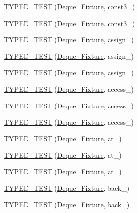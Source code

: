 \begin{DoxyCompactItemize}
\hyperlink{TestDeque_8c_09_09_ab358ac4c3269d7267b98cc0cddc690f0}{T\-Y\-P\-E\-D\-\_\-\-T\-E\-S\-T} (\hyperlink{structDeque__Fixture}{Deque\-\_\-\-Fixture}, const3\-\_)
\item 
\hyperlink{TestDeque_8c_09_09_abcf49f52a3b989cfde5d159c2fe7f635}{T\-Y\-P\-E\-D\-\_\-\-T\-E\-S\-T} (\hyperlink{structDeque__Fixture}{Deque\-\_\-\-Fixture}, const3\-\_)
\item 
\hyperlink{TestDeque_8c_09_09_a9a792cdc798d415d2d57588b804fd1e3}{T\-Y\-P\-E\-D\-\_\-\-T\-E\-S\-T} (\hyperlink{structDeque__Fixture}{Deque\-\_\-\-Fixture}, assign\-\_)
\item 
\hyperlink{TestDeque_8c_09_09_a16fcf777109c9ce6a9fad39225b5e56f}{T\-Y\-P\-E\-D\-\_\-\-T\-E\-S\-T} (\hyperlink{structDeque__Fixture}{Deque\-\_\-\-Fixture}, assign\-\_)
\item 
\hyperlink{TestDeque_8c_09_09_a0ce7f9e9f11841acd432236d64a496e5}{T\-Y\-P\-E\-D\-\_\-\-T\-E\-S\-T} (\hyperlink{structDeque__Fixture}{Deque\-\_\-\-Fixture}, assign\-\_)
\item 
\hyperlink{TestDeque_8c_09_09_a20dd092cb6619e4101dab0f8c3861472}{T\-Y\-P\-E\-D\-\_\-\-T\-E\-S\-T} (\hyperlink{structDeque__Fixture}{Deque\-\_\-\-Fixture}, access\-\_)
\item 
\hyperlink{TestDeque_8c_09_09_abc7b13e109a90839d7f24f935b0564c9}{T\-Y\-P\-E\-D\-\_\-\-T\-E\-S\-T} (\hyperlink{structDeque__Fixture}{Deque\-\_\-\-Fixture}, access\-\_)
\item 
\hyperlink{TestDeque_8c_09_09_a0d9e92fb1ff46b387f86b4c72a341ac1}{T\-Y\-P\-E\-D\-\_\-\-T\-E\-S\-T} (\hyperlink{structDeque__Fixture}{Deque\-\_\-\-Fixture}, access\-\_)
\item 
\hyperlink{TestDeque_8c_09_09_ae1b8e9255e24b98bca0edcffd9a958a8}{T\-Y\-P\-E\-D\-\_\-\-T\-E\-S\-T} (\hyperlink{structDeque__Fixture}{Deque\-\_\-\-Fixture}, at\-\_)
\item 
\hyperlink{TestDeque_8c_09_09_a59f7d15b79cebfd09c0e36d73be737df}{T\-Y\-P\-E\-D\-\_\-\-T\-E\-S\-T} (\hyperlink{structDeque__Fixture}{Deque\-\_\-\-Fixture}, at\-\_)
\item 
\hyperlink{TestDeque_8c_09_09_acaa6f28cbd4650cd3fdfe7d5e09fd5cc}{T\-Y\-P\-E\-D\-\_\-\-T\-E\-S\-T} (\hyperlink{structDeque__Fixture}{Deque\-\_\-\-Fixture}, at\-\_)
\item 
\hyperlink{TestDeque_8c_09_09_a1424f074b58e4781f3f8ac5f2d1c0f1d}{T\-Y\-P\-E\-D\-\_\-\-T\-E\-S\-T} (\hyperlink{structDeque__Fixture}{Deque\-\_\-\-Fixture}, back\-\_)
\item 
\hyperlink{TestDeque_8c_09_09_af4a4f2c5f5e65b2371c138a32f20575f}{T\-Y\-P\-E\-D\-\_\-\-T\-E\-S\-T} (\hyperlink{structDeque__Fixture}{Deque\-\_\-\-Fixture}, back\-\_)

\end{DoxyCompactItemize}
